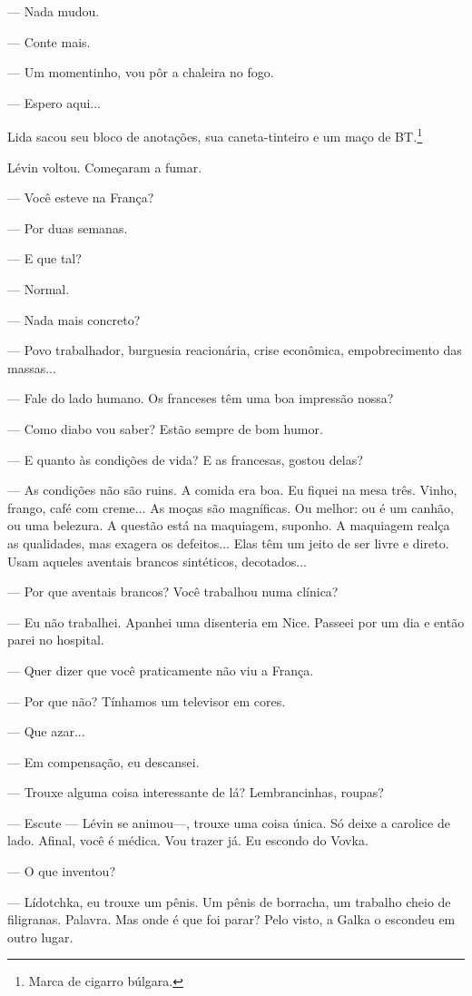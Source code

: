 --- Nada mudou.

--- Conte mais.

--- Um momentinho, vou pôr a chaleira no fogo.

--- Espero aqui...

Lida sacou seu bloco de anotações, sua caneta-tinteiro e um maço de
BT\emph{.}\footnote{Marca de cigarro búlgara.}

Lévin voltou. Começaram a fumar.

--- Você esteve na França?

--- Por duas semanas.

--- E que tal?

--- Normal.

--- Nada mais concreto?

--- Povo trabalhador, burguesia reacionária, crise econômica,
empobrecimento das massas...

--- Fale do lado humano. Os franceses têm uma boa impressão nossa?

--- Como diabo vou saber? Estão sempre de bom humor.

--- E quanto às condições de vida? E as francesas, gostou delas?

--- As condições não são ruins. A comida era boa. Eu fiquei na mesa
três. Vinho, frango, café com creme... As moças são magníficas. Ou
melhor: ou é um canhão, ou uma belezura. A questão está na maquiagem,
suponho. A maquiagem realça as qualidades, mas exagera os defeitos...
Elas têm um jeito de ser livre e direto. Usam aqueles aventais brancos
sintéticos, decotados...

--- Por que aventais brancos? Você trabalhou numa clínica?

--- Eu não trabalhei. Apanhei uma disenteria em Nice. Passeei por um dia
e então parei no hospital.

--- Quer dizer que você praticamente não viu a França.

--- Por que não? Tínhamos um televisor em cores.

--- Que azar...

--- Em compensação, eu descansei.

--- Trouxe alguma coisa interessante de lá? Lembrancinhas, roupas?

--- Escute --- Lévin se animou---, trouxe uma coisa única. Só deixe a
carolice de lado. Afinal, você é médica. Vou trazer já. Eu escondo do
Vovka.

--- O que inventou?

--- Lídotchka, eu trouxe um pênis. Um pênis de borracha, um trabalho
cheio de filigranas. Palavra. Mas onde é que foi parar? Pelo visto, a
Galka o escondeu em outro lugar.

